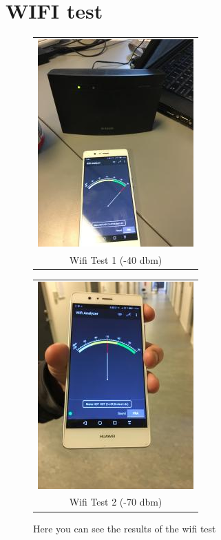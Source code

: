 \section{WIFI test}
\begin{figure}[ht!]
  \centering
  \begin{tabular}{@{}c@{}}
    \includegraphics[width=.3\textwidth]{figures/image.jpg} \\[\abovecaptionskip]
    \small  Wifi Test 1 (-40 dbm)
    \label{tab:1}
  \end{tabular}

  \vspace{\floatsep}

  \begin{tabular}{@{}c@{}}
    \includegraphics[width=.3\textwidth]{figures/image2.jpg} \\[\abovecaptionskip]
    \small  Wifi Test 2 (-70 dbm)
    \label{tab:2}
  \end{tabular}

  \caption{Here you can see the results of the wifi test}\label{fig:myfig}
\end{figure}